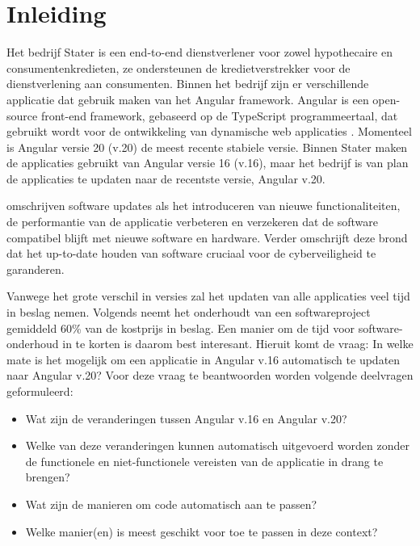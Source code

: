 
\section{Inleiding}
\label{sec:inleiding}

Het bedrijf Stater is een end-to-end dienstverlener voor zowel hypothecaire en consumentenkredieten, ze ondersteunen de kredietverstrekker voor de dienstverlening aan consumenten.
Binnen het bedrijf zijn er verschillende applicatie dat gebruik maken van het Angular framework.
Angular is een open-source front-end framework, gebaseerd op de TypeScript programmeertaal, dat gebruikt wordt voor de ontwikkeling van dynamische web applicaties \autocite{Cincovic2019}.
Momenteel is Angular versie 20 (v.20) de meest recente stabiele versie.
Binnen Stater maken de applicaties gebruikt van Angular versie 16 (v.16), maar het bedrijf is van plan de applicaties te updaten naar de recentste versie, Angular v.20.

\textcite{Vaniea2016} omschrijven software updates als het introduceren van nieuwe functionaliteiten, de performantie van de applicatie verbeteren en verzekeren dat de software compatibel blijft met nieuwe software en hardware.
Verder omschrijft deze brond dat het up-to-date houden van software cruciaal voor de cyberveiligheid te garanderen.

Vanwege het grote verschil in versies zal het updaten van alle applicaties veel tijd in beslag nemen.
Volgends \textcite{Kaur2015} neemt het onderhoudt van een softwareproject gemiddeld 60\% van de kostprijs in beslag.
Een manier om de tijd voor software-onderhoud in te korten is daarom best interesant.
Hieruit komt de vraag: In welke mate is het mogelijk om een applicatie in Angular v.16 automatisch te updaten naar Angular v.20?
Voor deze vraag te beantwoorden worden volgende deelvragen geformuleerd:
\begin{itemize}
  \item Wat zijn de veranderingen tussen Angular v.16 en Angular v.20?
  \item Welke van deze veranderingen kunnen automatisch uitgevoerd worden zonder de functionele en niet-functionele vereisten van de applicatie in drang te brengen?
  \item Wat zijn de manieren om code automatisch aan te passen?
  \item Welke manier(en) is meest geschikt voor toe te passen in deze context?
\end{itemize}

